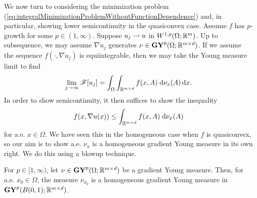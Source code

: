 We now turn to considering the minimization problem (\ref{eq:integralMinimizationProblemWithoutFunctionDependence}) and, in particular, showing lower semicontinuity in the quasiconvex case. Assume $f$ has $p$-growth for some $p \in (1,\infty)$. Suppose $u_j \rightharpoonup u$ in $W^{1,p}(\Omega;\mathbb{R}^m)$. Up to subsequence, we may assume $\nabla u_j$ generates $\nu \in \mathbf{GY}^p(\Omega;\mathbb{R}^{m \times d})$. If we assume the sequence $f(\cdot,\nabla u_j)$ is equiintegrable, then we may take the Young measure limit to find 
\begin{equation}
    \lim_{j \to \infty} \mathscr{F}[u_j] = \int_\Omega \int_{\mathbb{R}^{m \times d}} f(x,A) \; \mathrm{d}\nu_x(A) \, \mathrm{d} x.
\end{equation}
In order to show semicontinuity, it then suffices to show the inequality 
\begin{equation}
    f(x,\nabla u(x)) \leq \int_{\mathbb{R}^{m \times d}} f(x,A) \; \mathrm{d}\nu_x(A)
\end{equation}
for a.e. $x \in \Omega$. We have seen this in the homogeneous case when $f$ is quasiconvex, so our aim is to show a.e. $\nu_x$ is a homogeneous gradient Young measure in its own right. We do this using a blowup technique.
\begin{lemma} \label{lem:homogenizingGradientYM}
    For $p \in [1,\infty)$, let $\nu \in \mathbf{GY}^p(\Omega;\mathbb{R}^{m \times d})$ be a gradient Young measure. Then, for a.e. $x_0 \in \Omega$, the measure $\nu_{x_0}$ is a homogeneous gradient Young measure in $\mathbf{GY}^p(B(0,1);\mathbb{R}^{m \times d})$.
\end{lemma}
